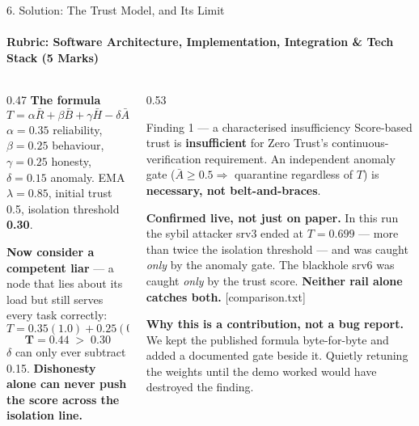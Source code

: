 \documentclass[aspectratio=169, 11pt]{beamer}
\newcommand{\rubric}[1]{Rubric: #1}
\newcommand{\src}[1]{{\color{gray}\tiny [#1]}}
\begin{document}
\begin{frame}{6. Solution: The Trust Model, and Its Limit}
    \framesubtitle{\rubric{Software Architecture, Implementation, Integration \& Tech Stack (5 Marks)}}
    \begin{columns}[T]
      \begin{column}{0.47\textwidth}
        \scriptsize
        \textbf{The formula}
        \[ T = \alpha \bar{R} + \beta \bar{B} + \gamma \bar{H} - \delta \bar{A} \]
        $\alpha{=}0.35$ reliability, $\beta{=}0.25$ behaviour,
        $\gamma{=}0.25$ honesty, $\delta{=}0.15$ anomaly.
        EMA $\lambda{=}0.85$, initial trust 0.5, isolation threshold \textbf{0.30}.

        \vspace{5pt}
        \textbf{Now consider a competent liar} --- a node that lies about its
        load but still serves every task correctly:
        \[ T = 0.35(1.0) + 0.25(0.96) + 0.25(0) - 0.15(1.0) \]
        \[ \mathbf{T = 0.44} \;>\; 0.30 \]
        $\delta$ can only ever subtract 0.15. \textbf{Dishonesty alone can never
        push the score across the isolation line.}
      \end{column}
      \begin{column}{0.53\textwidth}
        \scriptsize
        \begin{block}{\scriptsize Finding 1 --- a characterised insufficiency}
          \scriptsize
          Score-based trust is \textbf{insufficient} for Zero Trust's
          continuous-verification requirement. An independent anomaly gate
          ($\bar{A} \ge 0.5 \Rightarrow$ quarantine regardless of $T$) is
          \textbf{necessary, not belt-and-braces}.
        \end{block}
        \vspace{3pt}
        \textbf{Confirmed live, not just on paper.} In this run the sybil
        attacker srv3 ended at \textbf{$T = 0.699$} --- more than twice the
        isolation threshold --- and was caught \emph{only} by the anomaly gate.
        The blackhole srv6 was caught \emph{only} by the trust score.
        \textbf{Neither rail alone catches both.} \src{comparison.txt}

        \vspace{4pt}
        \textbf{Why this is a contribution, not a bug report.} We kept the
        published formula byte-for-byte and added a documented gate beside it.
        Quietly retuning the weights until the demo worked would have destroyed
        the finding.
      \end{column}
    \end{columns}
\end{frame}
\end{document}
